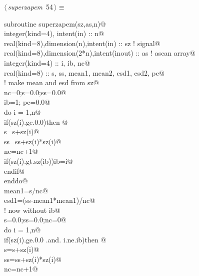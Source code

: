 \documentclass[10pt,a4paper,notitlepage]{article}
\begin{document}
\begin{flushleft} \small
\begin{minipage}{\linewidth}\label{scrap57}\raggedright\small
{} $\langle\,${\it superzapem}\nobreak\ {\footnotesize {54}}$\,\rangle\equiv$
\vspace{-1ex}
\begin{list}{}{} \item
\mbox{}\verb@      subroutine superzapem(sz,as,n)@\\
\mbox{}\verb@      integer(kind=4), intent(in) :: n@\\
\mbox{}\verb@      real(kind=8),dimension(n),intent(in) :: sz   ! signal@\\
\mbox{}\verb@      real(kind=8),dimension(2*n),intent(inout) :: as ! ascan array@\\
\mbox{}\verb@      integer(kind=4) :: i, ib, nc@\\
\mbox{}\verb@      real(kind=8) :: s, ss, mean1, mean2, esd1, esd2, pc@\\
\mbox{}\verb@      ! make mean and esd from sz@\\
\mbox{}\verb@      nc=0;s=0.0;ss=0.0@\\
\mbox{}\verb@      ib=1; pc=0.0@\\
\mbox{}\verb@      do i = 1,n@\\
\mbox{}\verb@        if(sz(i).ge.0.0)then @\\
\mbox{}\verb@           s=s+sz(i)@\\
\mbox{}\verb@           ss=ss+sz(i)*sz(i)@\\
\mbox{}\verb@           nc=nc+1@\\
\mbox{}\verb@           if(sz(i).gt.sz(ib))ib=i@\\
\mbox{}\verb@        endif@\\
\mbox{}\verb@      enddo@\\
\mbox{}\verb@      mean1=s/nc@\\
\mbox{}\verb@      esd1=(ss-mean1*mean1)/nc@\\
\mbox{}\verb@      ! now without ib@\\
\mbox{}\verb@      s=0.0;ss=0.0;nc=0@\\
\mbox{}\verb@      do i = 1,n@\\
\mbox{}\verb@        if(sz(i).ge.0.0 .and. i.ne.ib)then @\\
\mbox{}\verb@           s=s+sz(i)@\\
\mbox{}\verb@           ss=ss+sz(i)*sz(i)@\\
\mbox{}\verb@           nc=nc+1@\\

\end{list}
\end{minipage}
\end{flushleft}
\end{document}
